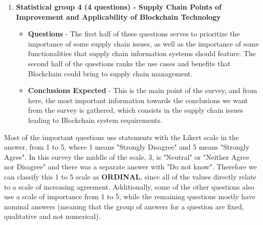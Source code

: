 \begin{enumerate}
\item \textbf{Statistical group 4 (4 questions) - Supply Chain Points of Improvement and Applicability of Blockchain Technology} 
	\begin{itemize}
    \item \textbf{Questions} - The first half of these questions serves to prioritize the importance of some supply chain issues, as well as the importance of some functionalities that supply chain information systems should feature. The second half of the questions ranks the use cases and benefits that Blockchain could bring to supply chain management.
    \item \textbf{Conclusions Expected} - This is the main point of the survey, and from here, the most important information towards the conclusions we want from the survey is gathered, which consists in the supply chain issues leading to Blockchain system requirements.
	\end{itemize}
    
\end{enumerate}


\par Most of the important questions use statements with the Likert scale in the answer, from 1 to 5, where 1 means "Strongly Disagree" and 5 means "Strongly Agree". In this survey the middle of the scale, 3, is "Neutral" or "Neither Agree nor Disagree" and there was a separate answer with "Do not know". Therefore we can classify this 1 to 5 scale as \textbf{ORDINAL}, since all of the values directly relate to a scale of increasing agreement. Additionally, some of the other questions also use a scale of importance from 1 to 5, while the remaining questions mostly have nominal answers (meaning that the group of answers for a question are fixed, qualitative and not numerical). 

